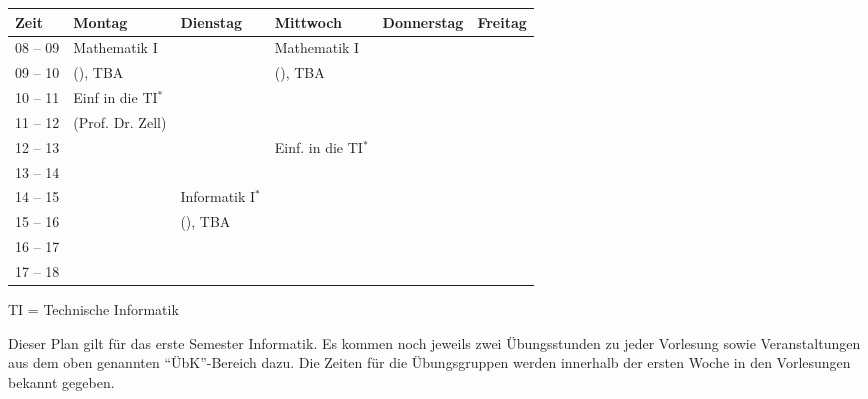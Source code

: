 \begin{minipage}{\textwidth}
    \footnotesize
\begin{center}
	\begin{table}[]
	\begin{tabular}{|l|l|l|l|l|l|}
	\hline
	 Zeit     &    Montag                    & Dienstag          & Mittwoch          	& Donnerstag & Freitag \\ \hline\hline
	 08 -- 09 &    Mathematik I              &                   & Mathematik I      	&  &  \\ \cline{1-1} \cline{3-3} \cline{5-6} 
	 09 -- 10 &    (\Matheprof), TBA         &                   & (\Matheprof), TBA 	&  &  \\ \hline
	 10 -- 11 &    Einf in die TI$^*$        &                   &                   	&  &  \\ \cline{1-1} \cline{3-6} 
	 11 -- 12 &    (Prof. Dr. Zell)          &                   &                   	&  &  \\ \hline
	 12 -- 13 &                              &                   & Einf. in die TI$^*$    	&  &  \\ \hline
	 13 -- 14 &                              &                   &                   	&  &  \\ \hline
	 14 -- 15 &                              & Informatik I$^*$  &                   	&  &  \\ \cline{1-2} \cline{4-6} 
	 15 -- 16 &                              & (\Infoprof), TBA  &                   	&  &  \\ \hline
	 16 -- 17 &                              &                   &                   	&  &  \\ \hline
	 17 -- 18 &                              &                   &                   	&  &  \\ \hline
	\end{tabular}
	\end{table}
	
\scriptsize TI = Technische Informatik

\end{center}
\end{minipage}
Dieser Plan gilt für das erste Semester Informatik. Es kommen noch jeweils zwei Übungsstunden zu jeder Vorlesung 
sowie Veranstaltungen aus dem oben genannten "`\"UbK"'-Bereich dazu.
Die Zeiten für die Übungsgruppen werden innerhalb der ersten Woche in den Vorlesungen bekannt gegeben.
